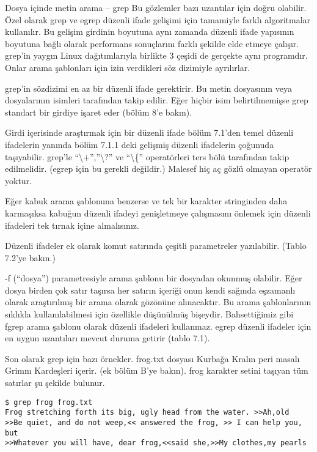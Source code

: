 \begin{section}{Dosya içinde metin arama – grep}
Bu gözlemler bazı uzantılar için doğru olabilir. Özel olarak grep ve egrep düzenli ifade gelişimi için tamamiyle farklı algoritmalar kullanılır. Bu gelişim girdinin boyutuna aynı zamanda düzenli ifade yapısının boyutuna bağlı olarak performans sonuçlarını farklı şekilde elde etmeye çalışır. grep’in yaygın Linux dağıtımlarıyla birlikte 3 çeşidi de gerçekte aynı programdır. Onlar arama şablonları için izin verdikleri söz dizimiyle ayrılırlar.

grep’in sözdizimi en az bir düzenli ifade gerektirir. Bu metin dosyasının veya dosyalarının isimleri tarafından takip edilir. Eğer hiçbir isim belirtilmemişse grep standart bir girdiye işaret eder (bölüm 8’e bakın).

Girdi içerisinde araştırmak için bir düzenli ifade bölüm 7.1’den temel düzenli ifadelerin yanında bölüm 7.1.1 deki gelişmiş düzenli ifadelerin çoğunuda taşıyabilir. grep’le “\textbackslash +”,”\textbackslash ?” ve “\textbackslash \{” operatörleri ters bölü tarafından takip edilmelidir. (egrep için bu gerekli değildir.) Malesef hiç aç gözlü olmayan operatör yoktur. 

Eğer kabuk arama şablonuna benzerse ve tek bir karakter stringinden daha karmaşıksa kabuğun düzenli ifadeyi genişletmeye çalışmasını önlemek için düzenli ifadeleri tek tırnak içine almalısınız.

Düzenli ifadeler ek olarak komut satırında çeşitli parametreler yazılabilir. (Tablo 7.2’ye bakın.)

-f (“dosya”) parametresiyle arama şablonu bir dosyadan okunmuş olabilir. Eğer dosya birden çok satır taşırsa her satırın içeriği onun kendi sağında eşzamanlı olarak araştırılmış bir arama olarak gözönüne alınacaktır. Bu arama şablonlarının sıklıkla kullanılabilmesi için özellikle düşünülmüş bişeydir. 
Bahsettiğimiz gibi fgrep arama şablonu olarak düzenli ifadeleri kullanmaz. egrep düzenli ifadeler için en uygun uzantıları mevcut duruma getirir (tablo 7.1).

Son olarak grep için bazı örnekler. frog.txt dosyası Kurbağa Kralın peri masalı Grimm Kardeşleri içerir. (ek bölüm B’ye bakın). frog karakter setini taşıyan tüm satırlar şu şekilde bulunur.
\begin{verbatim}
$ grep frog frog.txt
Frog stretching forth its big, ugly head from the water. >>Ah,old
>>Be quiet, and do not weep,<< answered the frog, >> I can help you, but
>>Whatever you will have, dear frog,<<said she,>>My clothes,my pearls
\end{verbatim}


\end{section}
